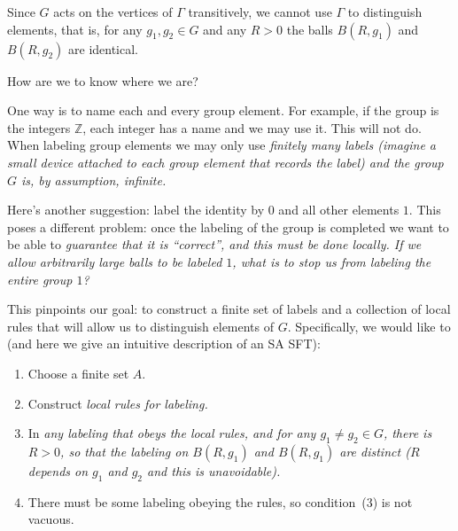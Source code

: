 \documentclass[12pt,reqno]{amsart}
\theoremstyle{plain}
\theoremstyle{definition}
\numberwithin{subcase}{case}
\theoremstyle{plain}
\theoremstyle{definition}
\begin{document}
Since \(G\) acts on the vertices of \(\Gamma\) transitively, we cannot use \(\Gamma\) to distinguish elements, that is, for any \(g_{1},g_{2} \in G\) and any \(R>0\) the balls \(B(R,g_{1})\) and  \(B(R,g_{2})\) are identical. 

How are we to know where we are?

One way is to name each and every group element. For example, if the group is the integers \(\mathbb{Z}\), each integer has a name and we may use it. This will not do. When labeling group elements we may only use \em finitely many \em labels (imagine a small device attached to each group element that records the label) and the group \(G\) is, by assumption, infinite.

Here's another suggestion: label the identity by \(0\) and all other elements \(1\). This poses a different problem: once the labeling of the group is completed we want to be able to \em guarantee \em  that it is ``correct'', and this must be done locally. If we allow arbitrarily large balls to be labeled \(1\), what is to stop us from labeling the entire group \(1\)?

This pinpoints our goal: to construct a finite set of labels and a collection of local rules that will allow us to distinguish elements of \(G\). Specifically, we would like to (and here we give an intuitive description of an SA SFT):
\begin{enumerate}
\item Choose a finite set \(A\).
\item Construct \em local rules \em for labeling.
\item In \em any \em labeling that obeys the local rules, and for any \(g_{1} \neq g_{2} \in G\), there is \(R>0\), so that the labeling on  \(B(R,g_{1})\) and  \(B(R,g_{1})\) are distinct (\(R\) depends on \(g_{1}\) and \(g_{2}\) and this is unavoidable).
\item There must be some labeling obeying the rules, so condition~(3) is not vacuous. 
\end{enumerate}
\end{document}
